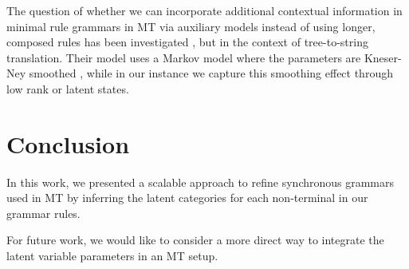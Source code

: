 \documentclass[11pt]{article}
\begin{document}
The question of whether we can incorporate additional contextual information in minimal rule grammars in MT via auxiliary models instead of using longer, composed rules has been investigated \cite{Vaswani2011}, but in the context of tree-to-string translation. 
Their model uses a Markov model where the parameters are Kneser-Ney smoothed \cite{Kneser1993}, while in our instance we capture this smoothing effect through low rank or latent states.  

\section{Conclusion}

In this work, we presented a scalable approach to refine synchronous grammars used in MT by inferring the latent categories for each non-terminal in our grammar rules.

For future work, we would like to consider a more direct way to integrate the latent variable parameters in an MT setup.  



\end{document}
